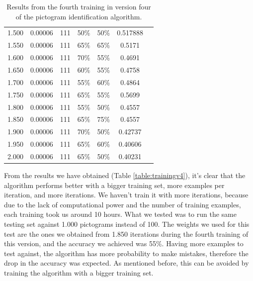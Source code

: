 \begin{table}[!ht]
\begin{center}
{\begin{tabular}{ |c|c|c|c|c|c|c| }
1.500 & 0.00006 & 111 & 50\% & 50\% & 0.517888\\
1.550 & 0.00006 & 111 & 65\% & 65\% & 0.5171\\
1.600 & 0.00006 & 111 & 70\% & 55\% & 0.4691\\
1.650 & 0.00006 & 111 & 60\% & 55\% & 0.4758\\
1.700 & 0.00006 & 111 & 55\% & 60\% & 0.4864\\
1.750 & 0.00006 & 111 & 65\% & 55\% & 0.5699\\
1.800 & 0.00006 & 111 & 55\% & 50\% & 0.4557\\
1.850 & 0.00006 & 111 & 65\% & 75\% & 0.4557\\
1.900 & 0.00006 & 111 & 70\% & 50\% & 0.42737\\
1.950 & 0.00006 & 111 & 65\% & 60\% & 0.40606\\
2.000 & 0.00006 & 111 & 65\% & 50\% & 0.40231\\
\hline 
\end{tabular}}
\end{center}
\caption{Results from the fourth training in version four of the pictogram identification algorithm.}
\label{table:trainingfour}
\end{table}

From the results we have obtained (Table \ref{table:trainingv4}), it's clear that the algorithm performs better with a bigger training set, more examples per iteration, and more iterations. We haven't train it with more iterations, because due to the lack of computational power and the number of training examples, each training took us around 10 hours. What we tested was to run the same testing set against 1.000 pictograms instead of 100. The weights we used for this test are the ones we obtained from 1.850 iterations during the fourth training of this version, and the accuracy we achieved was 55\%. Having more examples to test against, the algorithm has more probability to make mistakes, therefore the drop in the accuracy was expected. As mentioned before, this can be avoided by training the algorithm with a bigger training set.

